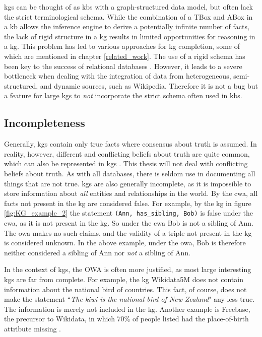 \glspl{kg} can be thought of as \glspl{kb} with a graph-structured data model, but often lack the strict terminological schema. While the combination of a TBox and ABox in a \gls{kb} allows the inference engine to derive a potentially infinite number of facts, the lack of rigid structure in a \gls{kg} results in limited opportunities for reasoning in a \gls{kg}. This problem has led to various approaches for \gls{kg} completion, some of which are mentioned in chapter \ref{related_work}. The use of a rigid schema has been key to the success of relational databases \cite{codd2002relational}. However, it leads to a severe bottleneck when dealing with the integration of data from heterogeneous, semi-structured, and dynamic sources, such as Wikipedia. Therefore it is not a bug but a feature for large \glspl{kg} to \textit{not} incorporate the strict schema often used in \glspl{kb}.

\subsection{Incompleteness}
\label{Integrity_of_KGs}
Generally, \glspl{kg} contain only true facts where consensus about truth is assumed. In reality, however, different and conflicting beliefs about truth are quite common, which can also be represented in \glspl{kg} \cite{subjective_kgs}. This thesis will not deal with conflicting beliefs about truth. As with all databases, there is seldom use in documenting all things that are not true. \glspl{kg} are also generally incomplete, as it is impossible to store information about \textit{all} entities and relationships in the world. By the \gls{cwa}, all facts not present in the \gls{kg} are considered false. For example, by the \gls{kg} in figure \ref{fig:KG_example_2} the statement \texttt{(Ann, has\_sibling, Bob)} is false under the \gls{cwa}, as it is not present in the \gls{kg}. So under the \gls{cwa} Bob is not a sibling of Ann. The \gls{owa} makes no such claims, and  the validity of a triple not present in the \gls{kg} is considered unknown. In the above example, under the \gls{owa}, Bob is therefore neither considered a sibling of Ann nor \textit{not} a sibling of Ann.

In the context of \glspl{kg}, the OWA is often more justified, as most large interesting \glspl{kg} are far from complete. For example, the \gls{kg} Wikidata5M does not contain information about the national bird of countries. This fact, of course, does not make the statement ``\textit{The kiwi is the national bird of New Zealand}" any less true. The information is merely not included in the \gls{kg}. Another example is Freebase, the precursor to Wikidata, in which 70\% of people listed had the place-of-birth attribute missing \cite{west2014knowledge}.

